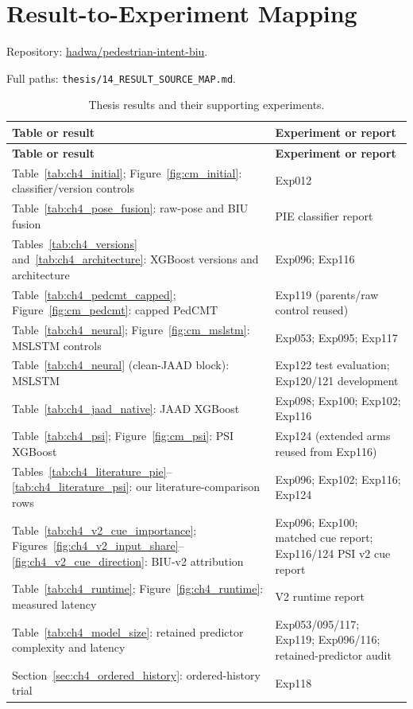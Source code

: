 \chapter{Result-to-Experiment Mapping}\label{app:experiment_map}

Repository: \href{https://github.com/hadwa/pedestrian-intent-biu}{hadwa/pedestrian-intent-biu}.\par
Full paths: \texttt{thesis/14\_RESULT\_SOURCE\_MAP.md}.

\begingroup
\thesistablestyle
\setlength{\extrarowheight}{1pt}
\renewcommand{\arraystretch}{1.08}
\begin{longtable}{@{}>{\RaggedRight\arraybackslash}p{0.64\dimexpr\textwidth-2\tabcolsep\relax}>{\RaggedRight\arraybackslash}p{0.36\dimexpr\textwidth-2\tabcolsep\relax}@{}}
\caption{Thesis results and their supporting experiments.}\label{tab:experiment_map}\\[3pt]
\toprule
\textbf{Table or result} & \textbf{Experiment or report}\\[3pt]
\midrule
\endfirsthead
\toprule
\textbf{Table or result} & \textbf{Experiment or report}\\[3pt]
\midrule
\endhead
Table~\ref{tab:ch4_initial}; Figure~\ref{fig:cm_initial}: classifier/version controls & Exp012\\[3pt]
Table~\ref{tab:ch4_pose_fusion}: raw-pose and BIU fusion & PIE classifier report\\[3pt]
Tables~\ref{tab:ch4_versions} and~\ref{tab:ch4_architecture}: XGBoost versions and architecture & Exp096; Exp116\\[3pt]
Table~\ref{tab:ch4_pedcmt_capped}; Figure~\ref{fig:cm_pedcmt}: capped PedCMT & Exp119 (parents/raw control reused)\\[3pt]
Table~\ref{tab:ch4_neural}; Figure~\ref{fig:cm_mslstm}: MSLSTM controls & Exp053; Exp095; Exp117\\[3pt]
Table~\ref{tab:ch4_neural} (clean-JAAD block): MSLSTM & Exp122 test evaluation; Exp120/121 development\\[3pt]
Table~\ref{tab:ch4_jaad_native}: JAAD XGBoost & Exp098; Exp100; Exp102; Exp116\\[3pt]
Table~\ref{tab:ch4_psi}; Figure~\ref{fig:cm_psi}: PSI XGBoost & Exp124 (extended arms reused from Exp116)\\[3pt]
Tables~\ref{tab:ch4_literature_pie}--\ref{tab:ch4_literature_psi}: our literature-comparison rows & Exp096; Exp102; Exp116; Exp124\\[3pt]
Table~\ref{tab:ch4_v2_cue_importance}; Figures~\ref{fig:ch4_v2_input_share}--\ref{fig:ch4_v2_cue_direction}: BIU-v2 attribution & Exp096; Exp100; matched cue report; Exp116/124 PSI v2 cue report\\[3pt]
Table~\ref{tab:ch4_runtime}; Figure~\ref{fig:ch4_runtime}: measured latency & V2 runtime report\\[3pt]
Table~\ref{tab:ch4_model_size}: retained predictor complexity and latency & Exp053/095/117; Exp119; Exp096/116; retained-predictor audit\\[3pt]
Section~\ref{sec:ch4_ordered_history}: ordered-history trial & Exp118\\[3pt]
\bottomrule
\end{longtable}
\endgroup
